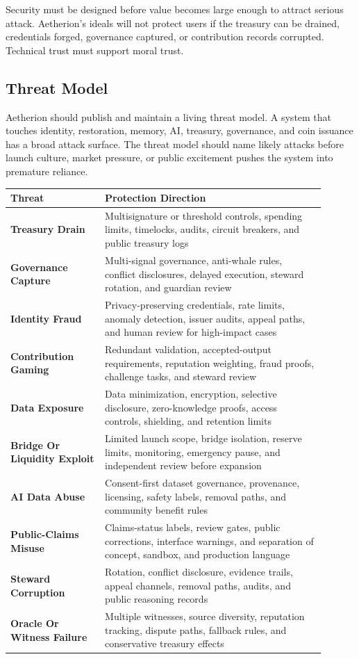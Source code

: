 \documentclass[12pt]{article}
\begin{document}
Security must be designed before value becomes large enough to attract serious attack. Aetherion's ideals will not protect users if the treasury can be drained, credentials forged, governance captured, or contribution records corrupted. Technical trust must support moral trust.


\subsection{Threat Model}

Aetherion should publish and maintain a living threat model. A system that touches identity, restoration, memory, AI, treasury, governance, and coin issuance has a broad attack surface. The threat model should name likely attacks before launch culture, market pressure, or public excitement pushes the system into premature reliance.

\begin{longtable}{>{\bfseries}p{0.27\linewidth}p{0.63\linewidth}}
\toprule
Threat & Protection Direction \\
\midrule
Treasury Drain & Multisignature or threshold controls, spending limits, timelocks, audits, circuit breakers, and public treasury logs \\
Governance Capture & Multi-signal governance, anti-whale rules, conflict disclosures, delayed execution, steward rotation, and guardian review \\
Identity Fraud & Privacy-preserving credentials, rate limits, anomaly detection, issuer audits, appeal paths, and human review for high-impact cases \\
Contribution Gaming & Redundant validation, accepted-output requirements, reputation weighting, fraud proofs, challenge tasks, and steward review \\
Data Exposure & Data minimization, encryption, selective disclosure, zero-knowledge proofs, access controls, shielding, and retention limits \\
Bridge Or Liquidity Exploit & Limited launch scope, bridge isolation, reserve limits, monitoring, emergency pause, and independent review before expansion \\
AI Data Abuse & Consent-first dataset governance, provenance, licensing, safety labels, removal paths, and community benefit rules \\
Public-Claims Misuse & Claims-status labels, review gates, public corrections, interface warnings, and separation of concept, sandbox, and production language \\
Steward Corruption & Rotation, conflict disclosure, evidence trails, appeal channels, removal paths, audits, and public reasoning records \\
Oracle Or Witness Failure & Multiple witnesses, source diversity, reputation tracking, dispute paths, fallback rules, and conservative treasury effects \\
\bottomrule
\end{longtable}
\end{document}

